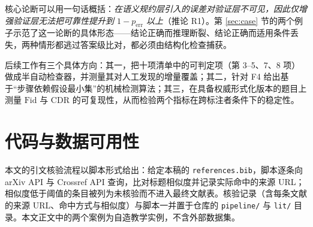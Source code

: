 核心论断可以用一句话概括：\emph{在语义规约层引入的误差对验证层不可见，因此仅增强验证层无法把可靠性提升到 $1-p_{\text{err}}$ 以上}（推论 R1）。第 \ref{sec:case} 节的两个例子示范了这一论断的具体形态——结论正确而推理断裂、结论正确而适用条件丢失，两种情形都逃过答案级比对，都必须由结构化检查捕获。

后续工作有三个具体方向：其一，把十项清单中的可判定项（第 3--5、7、8 项）做成半自动检查器，并测量其对人工发现的增量覆盖；其二，针对 F4 给出基于“步骤依赖假设最小集”的机械检测算法；其三，在具备权威形式化版本的题目上测量 $\mathrm{Fid}$ 与 $\mathrm{CDR}$ 的可复现性，从而检验两个指标在跨标注者条件下的稳定性。

\section*{代码与数据可用性}
本文的引文核验流程以脚本形式给出：给定本稿的 \texttt{references.bib}，脚本逐条向 arXiv API 与 Crossref API 查询，比对标题相似度并记录实际命中的来源 URL；相似度低于阈值的条目被列为未核验而不进入最终文献表。核验记录（含每条文献的来源 URL、命中方式与相似度）与脚本一并置于仓库的 \texttt{pipeline/} 与 \texttt{lit/} 目录。本文正文中的两个案例为自造教学实例，不含外部数据集。
